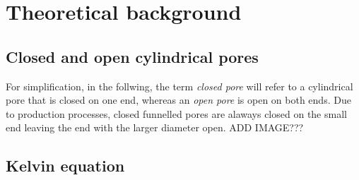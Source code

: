 \documentclass[../thesis.tex]{subfiles}
\begin{document}
  \chapter{Theoretical background}
  \label{ch:theoretical-background}

    \section{Closed and open cylindrical pores}
    \label{sec:cp-op}

      For simplification, in the follwing, the term \textit{closed pore} will refer to a cylindrical pore that is closed on one end, whereas an \textit{open pore} is open on both ends. Due to production processes, closed funnelled pores are alaways closed on the small end leaving the end with the larger diameter open.
      ADD IMAGE???


    \section{Kelvin equation}
    \label{sec:kelvin-equation}
\end{document}
